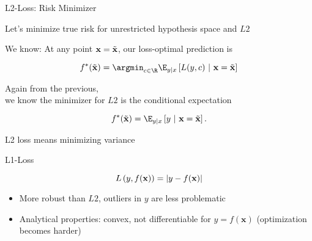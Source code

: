 \documentclass[11pt,compress,t,notes=noshow, xcolor=table]{beamer}
\begin{document}
\begin{framei}[sep=S]{L2-Loss: Risk Minimizer}

\item Let's minimize true risk for unrestricted hypothesis space and $L2$

\item We know: At any point $\mathbf{x} = \tilde{\mathbf{x}}$, our loss-optimal prediction is 

$$\fbayes(\xtil) = \argmin_{c \in \R} \E_{y|x}\left[L(y, c)~|~ \xv = \xtil \right]$$ 

\item Again from the previous, \\
we know the minimizer for $L2$ is the conditional expectation 

$$f^{\ast}(\xtil) = \E_{y|x} \left[y ~|~ \xv = \xtil \right]. $$



\end{framei}

\begin{frame}{L2 loss means minimizing variance}

  \vfill


\end{frame}

\begin{frame}{L1-Loss}

$$
L\left(y, f(\mathbf{x})\right) = \left|y-f(\mathbf{x})\right|
$$

\begin{itemize}
\item More robust than $L2$, outliers in $y$ are less problematic
\item Analytical properties: convex, not differentiable for $y = f(\bm{x})$ (optimization becomes harder)
\end{itemize}

\vfill


\end{frame}
\end{document}

